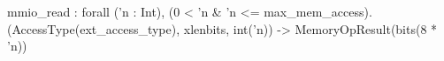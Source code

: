 mmio_read : forall ('n : Int), (0 < 'n & 'n <= max_mem_access).
  (AccessType(ext_access_type), xlenbits, int('n)) -> MemoryOpResult(bits(8 * 'n))